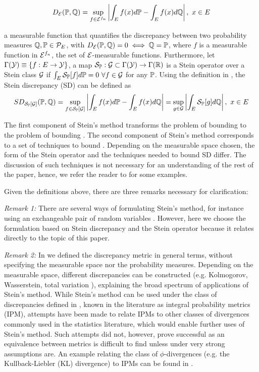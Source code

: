 \begin{equation}\label{IPM}
D_{\mathcal{E}}(\mathbb{P}, \mathbb{Q}) = \sup_{f \in \mathcal{E}^{f_n}}\left|\int_E f(x)d\mathbb{P} - \int_E f(x)d\mathbb{Q}\right|, \ x \in E
\end{equation}

a measurable function that quantifies the discrepancy between two probability measures $\mathbb{Q},\mathbb{P} \in \mathcal{P}_{E}$, with $D_{\mathcal{E}}(\mathbb{P}, \mathbb{Q}) = 0 \iff \mathbb{Q}= \mathbb{P}$, where $f$ is a measurable function in $\mathcal{E}^{f_n}$, the set of $\mathcal{E}$-measurable functions. Furthermore, let $\Gamma(\mathcal{Y}) \equiv \{f: E \rightarrow \mathcal{Y} \}$, a map $\mathcal{S}_{\mathbb{P}}: \mathcal{G} \subset \Gamma(\mathcal{Y}) \rightarrow \Gamma(\mathbb{R})$ is a Stein operator over a Stein class $\mathcal{G}$ if $\int_E \mathcal{S}_{\mathbb{P}}[f]d\mathbb{P} = 0 \ \forall f \in \mathcal{G}$ for any $\mathbb{P}$. Using the definition in , the Stein discrepancy (SD) can be defined as 
\begin{equation}\label{stein_discrepancy}
SD_{\mathcal{S}_{\mathbb{P}}[\mathcal{G}]}(\mathbb{P},\mathbb{Q}) = \sup_{f \in \mathcal{S}_{\mathbb{P}}[\mathcal{G}]} \left|\int_E f(x)d\mathbb{P} - \int_E f(x)d\mathbb{Q} \right| = \sup_{g \in \mathcal{G}}\left|\int_E \mathcal{S}_{\mathbb{P}}[g]d\mathbb{Q} \right|, \ x \in E
\end{equation}

The first component of Stein's method transforms the problem of bounding  to the problem of bounding . The second component of Stein's method corresponds to a set of techniques to bound . Depending on the measurable space chosen, the form of the Stein operator and the techniques needed to bound SD differ. The discussion of such techniques is not necessary for an understanding of the rest of the paper, hence, we refer the reader to \cite{ross2011fundamentals} for some examples. 

Given the definitions above, there are three remarks necessary for clarification:

\emph{Remark 1:} There are several ways of formulating Stein's method, for instance using an exchangeable pair of random variables \cite{stein1986approximate}. However, here we choose the formulation based on Stein discrepancy and the Stein operator because it relates directly to the topic of this paper.

\emph{Remark 2:} In  we defined the discrepancy metric in general terms, without specifying the measurable space nor the probability measures. Depending on the measurable space, different discrepancies can be constructed (e.g. Kolmogorov, Wasserstein, total variation \cite{ross2011fundamentals}), explaining the broad spectrum of applications of Stein's method. While Stein's method can be used under the class of discrepancies defined in , known in the literature as integral probability metrics (IPM), attempts have been made to relate IPMs to other classes of divergences commonly used in the statistics literature, which would enable further uses of Stein's method. Such attempts did not, however, prove successful as an equivalence between metrics is difficult to find unless under very strong assumptions are. An example relating the class of $\phi$-divergences (e.g. the Kullback-Liebler (KL) divergence) to IPMs can be found in \cite{sriperumbudur2009integral}.


